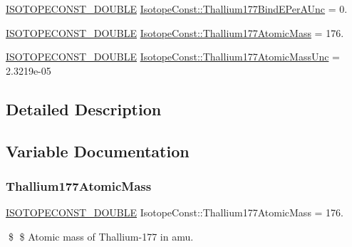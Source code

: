 \begin{DoxyCompactItemize}
\mbox{\hyperlink{group___isotope_const-_macros_ga8f45a7272ce02c0b4c65c44636ed719a}{I\+S\+O\+T\+O\+P\+E\+C\+O\+N\+S\+T\+\_\+\+D\+O\+U\+B\+LE}} \mbox{\hyperlink{group___isotope_const-_thallium-_tl177_gaca9962061409f6d5eb96abf497ecead4}{Isotope\+Const\+::\+Thallium177\+Bind\+E\+Per\+A\+Unc}} = 0.
\item 
\mbox{\hyperlink{group___isotope_const-_macros_ga8f45a7272ce02c0b4c65c44636ed719a}{I\+S\+O\+T\+O\+P\+E\+C\+O\+N\+S\+T\+\_\+\+D\+O\+U\+B\+LE}} \mbox{\hyperlink{group___isotope_const-_thallium-_tl177_ga86c8c0d59dbca47ecee85d4b32ee6c23}{Isotope\+Const\+::\+Thallium177\+Atomic\+Mass}} = 176.
\item 
\mbox{\hyperlink{group___isotope_const-_macros_ga8f45a7272ce02c0b4c65c44636ed719a}{I\+S\+O\+T\+O\+P\+E\+C\+O\+N\+S\+T\+\_\+\+D\+O\+U\+B\+LE}} \mbox{\hyperlink{group___isotope_const-_thallium-_tl177_ga6819a31ba856fdf3d0aed81d772d1aa3}{Isotope\+Const\+::\+Thallium177\+Atomic\+Mass\+Unc}} = 2.\+3219e-\/05
\end{DoxyCompactItemize}


\subsection{Detailed Description}


\subsection{Variable Documentation}
\mbox{\label{group___isotope_const-_thallium-_tl177_ga86c8c0d59dbca47ecee85d4b32ee6c23}} 
\subsubsection{\texorpdfstring{Thallium177\+Atomic\+Mass}{Thallium177AtomicMass}}
{\footnotesize\ttfamily \mbox{\hyperlink{group___isotope_const-_macros_ga8f45a7272ce02c0b4c65c44636ed719a}{I\+S\+O\+T\+O\+P\+E\+C\+O\+N\+S\+T\+\_\+\+D\+O\+U\+B\+LE}} Isotope\+Const\+::\+Thallium177\+Atomic\+Mass = 176.}

\$ \$ Atomic mass of Thallium-\/177 in amu. \mbox{\label{group___isotope_const-_thallium-_tl177_ga6819a31ba856fdf3d0aed81d772d1aa3}} 
